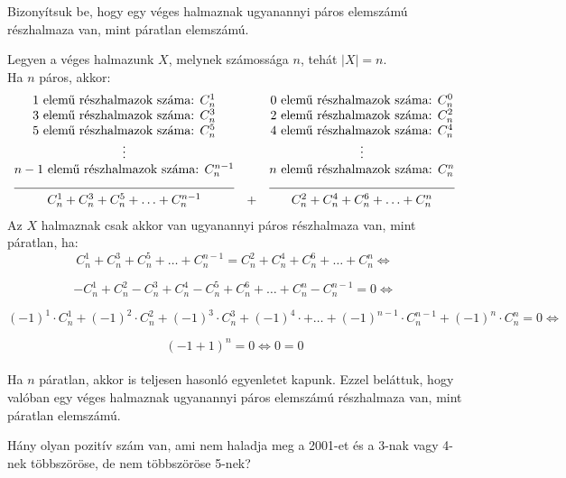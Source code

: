 \begin{problem}
	Bizonyítsuk be, hogy egy véges halmaznak ugyanannyi páros elemszámú
	részhalmaza van, mint páratlan elemszámú. 
\end{problem}
\begin{solution}
	Legyen a véges halmazunk $X$, melynek számossága $n$, tehát $|X|=n$.
	\\
	Ha $n$ páros, akkor: 
	{\def\arraystretch{1.2}
	\[\begin{array}{ccc}
		\text{1 elemű részhalmazok száma: }C_{n}^{1} & & \text{0 elemű részhalmazok száma: }C_{n}^{0}\\
		\text{3 elemű részhalmazok száma: }C_{n}^{3} & & \text{2 elemű részhalmazok száma: }C_{n}^{2}\\
		\text{5 elemű részhalmazok száma: }C_{n}^{5} & & \text{4 elemű részhalmazok száma: }C_{n}^{4}\\
		\vdots & & \vdots\\
		\text{\ensuremath{n-1} elemű részhalmazok száma: }C_{n}^{n-1} & & \text{\ensuremath{n} elemű részhalmazok száma: }C_{n}^{n}\\
		\hrulefill & & \hrulefill\\
		C_{n}^{1}+C_{n}^{3}+C_{n}^{5}+\ldots+C_{n}^{n-1} & + & C_{n}^{2}+C_{n}^{4}+C_{n}^{6}+\ldots+C_{n}^{n}
	\end{array}\]
}
	Az $X$ halmaznak csak akkor van ugyanannyi páros részhalmaza van,
	mint páratlan, ha:
	\[
	C_{n}^{1}+C_{n}^{3}+C_{n}^{5}+\ldots+C_{n}^{n-1}=C_{n}^{2}+C_{n}^{4}+C_{n}^{6}+\ldots+C_{n}^{n}\Leftrightarrow
	\]
	
	\[
	-C_{n}^{1}+C_{n}^{2}-C_{n}^{3}+C_{n}^{4}-C_{n}^{5}+C_{n}^{6}+\ldots+C_{n}^{n}-C_{n}^{n-1}=0\Leftrightarrow
	\]
	
	\[
	(-1)^{1}\cdot C_{n}^{1}+(-1)^{2}\cdot C_{n}^{2}+(-1)^{3}\cdot C_{n}^{3}+(-1)^{4}\cdot+\ldots+(-1)^{n-1}\cdot C_{n}^{n-1}+(-1)^{n}\cdot C_{n}^{n}=0\Leftrightarrow
	\]
	
	\[
	(-1+1)^{n}=0\Leftrightarrow0=0
	\]
	\\
	Ha $n$ páratlan, akkor is teljesen hasonló egyenletet kapunk. Ezzel
	beláttuk, hogy valóban egy véges halmaznak ugyanannyi páros elemszámú
	részhalmaza van, mint páratlan elemszámú. 
\end{solution}
\begin{problem}
	Hány olyan pozitív szám van, ami nem haladja meg a 2001-et és a 3-nak
	vagy 4-nek többszöröse, de nem többszöröse 5-nek? 
\end{problem}
